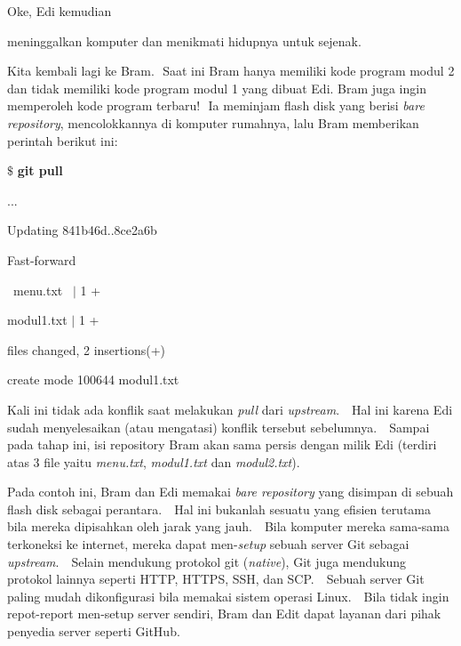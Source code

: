 \noindent 
Oke, Edi kemudian  \par
\noindent 
meninggalkan komputer dan menikmati hidupnya untuk sejenak. \par
\noindent 
Kita kembali lagi ke Bram. $  $ Saat ini Bram hanya memiliki kode program modul 2 dan tidak memiliki kode program modul 1 yang dibuat Edi. Bram juga ingin memperoleh kode program terbaru! $  $ Ia meminjam flash disk yang berisi \textit{bare repository}, mencolokkannya di komputer rumahnya, lalu Bram memberikan perintah berikut ini: \par
\vspace{12pt}
\noindent 
 $  \$  $ \textbf{git pull} \par
\noindent 
... \par
\noindent 
Updating 841b46d..8ce2a6b \par
\noindent 
Fast-forward \par
\noindent 
~menu.txt~   $  \vert  $ 1 + \par
\noindent 
 modul1.txt  $  \vert  $ 1 + \par
{} files changed, 2 insertions(+) \par
\noindent 
 create mode 100644 modul1.txt \par
\noindent 
\vspace{12pt}
\noindent 
\vspace{12pt}
\noindent 
\vspace{12pt}
\noindent 
Kali ini tidak ada konflik saat melakukan \textit{pull} dari \textit{upstream}. $  $ $  $ Hal ini karena Edi sudah menyelesaikan (atau mengatasi) konflik tersebut sebelumnya. $  $ $  $ Sampai pada tahap ini, isi repository Bram akan sama persis dengan milik Edi (terdiri atas 3 file yaitu \textit{menu.txt}, \textit{modul1.txt} dan \textit{modul2.txt}). \par
\vspace{12pt}
\noindent 
Pada contoh ini, Bram dan Edi memakai \textit{bare repository} yang disimpan di sebuah flash disk sebagai perantara. $  $ $  $ Hal ini bukanlah sesuatu yang efisien terutama bila mereka dipisahkan oleh jarak yang jauh. $  $ $  $ Bila komputer mereka sama-sama terkoneksi ke internet, mereka dapat men-\textit{setup} sebuah server Git sebagai \textit{upstream}. $  $ $  $ Selain mendukung protokol git (\textit{native}), Git juga mendukung protokol lainnya seperti HTTP, HTTPS, SSH, dan SCP. $  $ $  $ Sebuah server Git paling mudah dikonfigurasi bila memakai sistem operasi Linux. $  $ $  $ Bila tidak ingin repot-report men-setup server sendiri, Bram dan Edit dapat layanan dari pihak penyedia server seperti GitHub. \par
\vspace{12pt}

